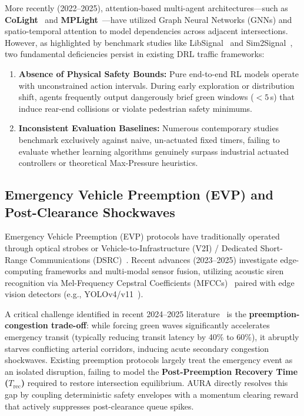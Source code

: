 More recently (2022--2025), attention-based multi-agent architectures—such as \textbf{CoLight}~\cite{wei2019colight} and \textbf{MPLight}~\cite{chen2020mplight}—have utilized Graph Neural Networks (GNNs) and spatio-temporal attention to model dependencies across adjacent intersections. However, as highlighted by benchmark studies like LibSignal~\cite{mei2022libsignal} and Sim2Signal~\cite{mei2024sim2signal}, two fundamental deficiencies persist in existing DRL traffic frameworks:
\begin{enumerate}
    \item \textbf{Absence of Physical Safety Bounds:} Pure end-to-end RL models operate with unconstrained action intervals. During early exploration or distribution shift, agents frequently output dangerously brief green windows ($<5$\,s) that induce rear-end collisions or violate pedestrian safety minimums.
    \item \textbf{Inconsistent Evaluation Baselines:} Numerous contemporary studies benchmark exclusively against naive, un-actuated fixed timers, failing to evaluate whether learning algorithms genuinely surpass industrial actuated controllers or theoretical Max-Pressure heuristics.
\end{enumerate}

\subsection{Emergency Vehicle Preemption (EVP) and Post-Clearance Shockwaves}
Emergency Vehicle Preemption (EVP) protocols have traditionally operated through optical strobes or Vehicle-to-Infrastructure (V2I) / Dedicated Short-Range Communications (DSRC)~\cite{klein2001sensor}. Recent advances (2023--2025) investigate edge-computing frameworks and multi-modal sensor fusion, utilizing acoustic siren recognition via Mel-Frequency Cepstral Coefficients (MFCCs)~\cite{salamon2014urbansound} paired with edge vision detectors (e.g., YOLOv4/v11~\cite{bochkovskiy2020yolov4}).

A critical challenge identified in recent 2024--2025 literature~\cite{zhang2024fogevp, liu2023collaborative} is the \textbf{preemption-congestion trade-off}: while forcing green waves significantly accelerates emergency transit (typically reducing transit latency by 40\% to 60\%), it abruptly starves conflicting arterial corridors, inducing acute secondary congestion shockwaves. Existing preemption protocols largely treat the emergency event as an isolated disruption, failing to model the \textbf{Post-Preemption Recovery Time ($T_{\text{rec}}$)} required to restore intersection equilibrium. AURA directly resolves this gap by coupling deterministic safety envelopes with a momentum clearing reward that actively suppresses post-clearance queue spikes.
